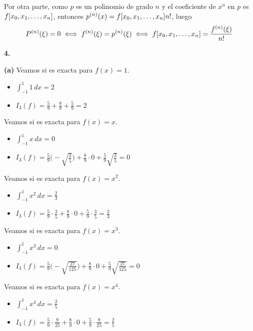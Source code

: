 \documentclass[12pt]{report}
\begin{document}
\vspace{2mm}
Por otra parte, como $p$ es un polinomio de grado $n$ y el coeficiente de $x^n$ en $p$ es $f[x_0,x_1,\mathellipsis,x_n]$, entonces $p^{(n)}(x) = f[x_0,x_1,\mathellipsis,x_n]n!$, luego
\[P^{(n)}(\xi) = 0 \iff f^{(n)}(\xi) = p^{(n)}(\xi) \iff f[x_0,x_1,\mathellipsis,x_n] = \frac{f^{(n)}(\xi)}{n!}\]

\vspace{2mm}
\textbf{4. }

\vspace{2mm}
\textbf{(a) } Veamos si es exacta para $f(x) = 1$.
\begin{itemize}
    \item $\displaystyle \int_{-1}^1 1 \, dx = 2$
    \item $\displaystyle I_3(f) = \frac{5}{9} + \frac{8}{9} + \frac{5}{9} = 2$
\end{itemize}
Veamos si es exacta para $f(x) = x$.
\begin{itemize}
    \item $\displaystyle \int_{-1}^1 x \, dx = 0$
    \item $\displaystyle I_3(f) = \frac{5}{9} \biggl(-\sqrt{\frac{3}{5}} \biggr) + \frac{8}{9} \cdot 0 + \frac{5}{9} \sqrt{\frac{3}{5}} = 0$
\end{itemize}
Veamos si es exacta para $f(x) = x^2$.
\begin{itemize}
    \item $\displaystyle \int_{-1}^1 x^2 \, dx = \frac{2}{3}$
    \item $\displaystyle I_3(f) = \frac{5}{9} \cdot \frac{3}{5} + \frac{8}{9} \cdot 0 + \frac{5}{9} \cdot \frac{3}{5} = \frac{2}{3}$
\end{itemize}
Veamos si es exacta para $f(x) = x^3$.
\begin{itemize}
    \item $\displaystyle \int_{-1}^1 x^3 \, dx = 0$
    \item $\displaystyle I_3(f) = \frac{5}{9} \biggl(-\sqrt{\frac{27}{125}} \biggr) + \frac{8}{9} \cdot 0 + \frac{5}{9} \sqrt{\frac{27}{125}} = 0$
\end{itemize}
Veamos si es exacta para $f(x) = x^4$.
\begin{itemize}
    \item $\displaystyle \int_{-1}^1 x^4 \, dx = \frac{2}{5}$
    \item $\displaystyle I_3(f) = \frac{5}{9} \cdot \frac{9}{25} + \frac{8}{9} \cdot 0 + \frac{5}{9} \cdot \frac{9}{25} = \frac{2}{5}$
\end{itemize}
\end{document}

